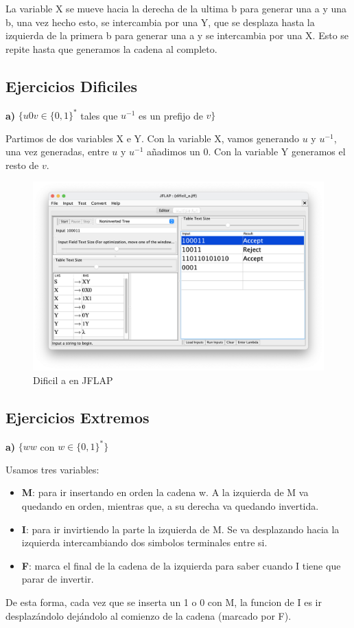 La variable X se mueve hacia la derecha de la ultima b para generar una a y una b, una vez hecho esto, se intercambia por una Y, que se desplaza hasta la izquierda de la primera b para generar una a y se intercambia por una X. Esto se repite hasta que generamos la cadena al completo.

\subsection{Ejercicios Dificiles}

\textbf{a)}  $\{ u0v \in \{0,1\}^{\ast} $ tales que $u^{-1}$ es un prefijo de $v\}$

Partimos de dos variables X e Y. Con la variable X, vamos generando $u$ y $u^{-1}$, una vez generadas, entre $u$ y $u^{-1}$ añadimos un 0. Con la variable Y generamos el resto de $v$.


\begin{figure}[H] 
	\centering
	\includegraphics[scale=0.35]{../practica_1/images/dificil_a.png} 
	\caption{Dificil a en JFLAP} 
    \label{fig:dificil_a}
\end{figure}

\subsection{Ejercicios Extremos}

\textbf{a)}  $\{ ww$ con $w \in \{0,1\}^{\ast}\}$

Usamos tres variables:
\begin{itemize}
\item \textbf{M}: para ir insertando en orden la cadena w. A la izquierda de M va quedando en orden, mientras que, a su derecha va quedando invertida.
\item \textbf{I}: para ir invirtiendo la parte la izquierda de M. Se va desplazando hacia la izquierda intercambiando dos simbolos terminales entre si.
\item \textbf{F}: marca el final de la cadena de la izquierda para saber cuando I tiene que parar de invertir. 
\end{itemize}
De esta forma, cada vez que se inserta un 1 o 0 con M, la funcion de I es ir desplazándolo dejándolo al comienzo de la cadena (marcado por F).


